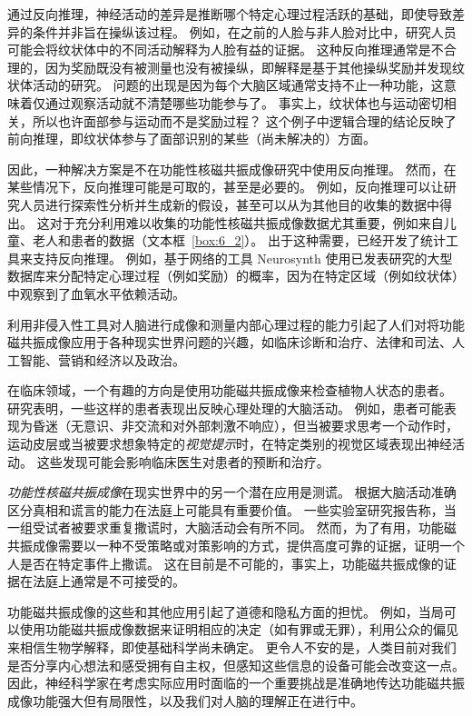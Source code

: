 通过反向推理，神经活动的差异是推断哪个特定心理过程活跃的基础，即使导致差异的条件并非旨在操纵该过程。 
例如，在之前的人脸与非人脸对比中，研究人员可能会将纹状体中的不同活动解释为人脸有益的证据。
这种反向推理通常是不合理的，因为奖励既没有被测量也没有被操纵，即解释是基于其他操纵奖励并发现纹状体活动的研究。
问题的出现是因为每个大脑区域通常支持不止一种功能，这意味着仅通过观察活动就不清楚哪些功能参与了。
事实上，纹状体也与运动密切相关，所以也许面部参与运动而不是奖励过程？
这个例子中逻辑合理的结论反映了前向推理，即纹状体参与了面部识别的某些（尚未解决的）方面。


因此，一种解决方案是不在功能性核磁共振成像研究中使用反向推理。
然而，在某些情况下，反向推理可能是可取的，甚至是必要的。
例如，反向推理可以让研究人员进行探索性分析并生成新的假设，甚至可以从为其他目的收集的数据中得出。
这对于充分利用难以收集的功能性核磁共振成像数据尤其重要，例如来自儿童、老人和患者的数据（文本框~\ref{box:6_2}）。
出于这种需要，已经开发了统计工具来支持反向推理。
例如，基于网络的工具 Neurosynth 使用已发表研究的大型数据库来分配特定心理过程（例如奖励）的概率，因为在特定区域（例如纹状体）中观察到了血氧水平依赖活动。


\begin{proposition}[现实世界中的大脑成像] \label{box:6_2}
	
	\quad \quad 利用非侵入性工具对人脑进行成像和测量内部心理过程的能力引起了人们对将功能磁共振成像应用于各种现实世界问题的兴趣，如临床诊断和治疗、法律和司法、人工智能、营销和经济以及政治。
	
	\quad \quad 在临床领域，一个有趣的方向是使用功能磁共振成像来检查植物人状态的患者。
	研究表明，一些这样的患者表现出反映心理处理的大脑活动。
	例如，患者可能表现为昏迷（无意识、非交流和对外部刺激不响应），但当被要求思考一个动作时，运动皮层或当被要求想象特定的\textit{视觉提示}时，在特定类别的视觉区域表现出神经活动。
	这些发现可能会影响临床医生对患者的预断和治疗。
	
	\quad \quad \textit{功能性核磁共振成像}在现实世界中的另一个潜在应用是测谎。
	根据大脑活动准确区分真相和谎言的能力在法庭上可能具有重要价值。
	一些实验室研究报告称，当一组受试者被要求重复撒谎时，大脑活动会有所不同。
	然而，为了有用，功能磁共振成像需要以一种不受策略或对策影响的方式，提供高度可靠的证据，证明一个人是否在特定事件上撒谎。
	这在目前是不可能的，事实上，功能磁共振成像的证据在法庭上通常是不可接受的。
	
	\quad \quad 功能磁共振成像的这些和其他应用引起了道德和隐私方面的担忧。
	例如，当局可以使用功能磁共振成像数据来证明相应的决定（如有罪或无罪），利用公众的偏见来相信生物学解释，即使基础科学尚未确定。
	更令人不安的是，人类目前对我们是否分享内心想法和感受拥有自主权，但感知这些信息的设备可能会改变这一点。
	因此，神经科学家在考虑实际应用时面临的一个重要挑战是准确地传达功能磁共振成像功能强大但有局限性，以及我们对人脑的理解正在进行中。
	
\end{proposition}


